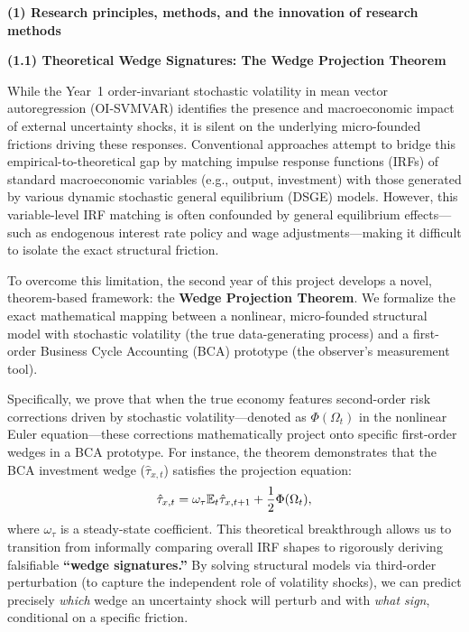 %
%

\noindent\textbf{(1) Research principles, methods, and the innovation of research methods}

\bigskip

\noindent\textbf{(1.1) Theoretical Wedge Signatures: The Wedge Projection Theorem}

\medskip

While the Year~1 order-invariant stochastic volatility in mean vector autoregression (OI-SVMVAR) identifies the presence and macroeconomic impact of external uncertainty shocks, it is silent on the underlying micro-founded frictions driving these responses. Conventional approaches attempt to bridge this empirical-to-theoretical gap by matching impulse response functions (IRFs) of standard macroeconomic variables (e.g., output, investment) with those generated by various dynamic stochastic general equilibrium (DSGE) models. However, this variable-level IRF matching is often confounded by general equilibrium effects---such as endogenous interest rate policy and wage adjustments---making it difficult to isolate the exact structural friction.

To overcome this limitation, the second year of this project develops a novel, theorem-based framework: the \textbf{Wedge Projection Theorem}. We formalize the exact mathematical mapping between a nonlinear, micro-founded structural model with stochastic volatility (the true data-generating process) and a first-order Business Cycle Accounting (BCA) prototype (the observer's measurement tool). 

Specifically, we prove that when the true economy features second-order risk corrections driven by stochastic volatility---denoted as $\Phi(\Omega_t)$ in the nonlinear Euler equation---these corrections mathematically project onto specific first-order wedges in a BCA prototype. For instance, the theorem demonstrates that the BCA investment wedge ($\hat\tau_{x,t}$) satisfies the projection equation:
\begin{equation}
\hat\tau_{x,t} = \omega_\tau\mathbb{E}_t\hat\tau_{x,t+1} + \frac{1}{2}\Phi(\Omega_t),
\end{equation}
where $\omega_\tau$ is a steady-state coefficient. This theoretical breakthrough allows us to transition from informally comparing overall IRF shapes to rigorously deriving falsifiable \textbf{``wedge signatures.''} By solving structural models via third-order perturbation (to capture the independent role of volatility shocks), we can predict precisely \emph{which} wedge an uncertainty shock will perturb and with \emph{what sign}, conditional on a specific friction.

